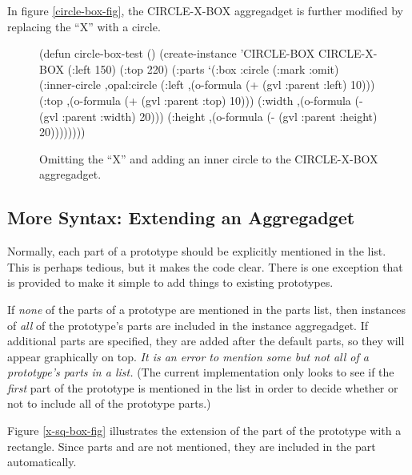 In figure \ref{circle-box-fig}, the CIRCLE-X-BOX aggregadget is
further modified by replacing the ``X'' with a circle.

\begin{figure}
\begin{center}
\end{center}
\begin{programexample}

(defun circle-box-test ()
  (create-instance 'CIRCLE-BOX CIRCLE-X-BOX
   (:left 150)
   (:top 220)
   (:parts
    `(:box
      :circle
      (:mark :omit)
      (:inner-circle ,opal:circle
	     (:left ,(o-formula (+ (gvl :parent :left) 10)))
	     (:top ,(o-formula (+ (gvl :parent :top) 10)))
	     (:width ,(o-formula (- (gvl :parent :width) 20)))
	     (:height ,(o-formula (- (gvl :parent :height) 20))))))))
\end{programexample}
\caption{Omitting the ``X'' and adding an inner circle to the
CIRCLE-X-BOX aggregadget.}
\end{figure}

\subsection{More Syntax: Extending an Aggregadget}
\label{more-syntax-sec}
Normally, each part of a prototype should be explicitly mentioned
in the  list.  This is perhaps tedious, but it makes the
code clear.  There is one exception
that is provided to make it simple to add things to existing prototypes.

If {\it none} of the parts of a prototype are mentioned in the parts list,
then instances of {\it all} of the prototype's parts are included in
the instance aggregadget.  If additional parts are specified, they
are added after the default parts, so they will appear graphically on
top.  {\it It is
an error to mention some but not all of a prototype's parts in a 
list.}  (The current implementation only looks to see if the {\it first}
part of the prototype is mentioned in the  list in order to
decide whether or not to include all of the prototype parts.)

Figure \ref{x-sq-box-fig} illustrates the extension of
the  part of the  prototype with
a rectangle.  Since parts 
and  are not mentioned, they are included in the 
part automatically.

